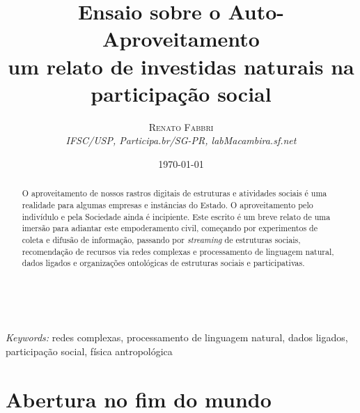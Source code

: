 \documentclass[a4paper, 11pt]{article} %
\title{\textbf{Ensaio sobre o Auto-Aproveitamento}\\ %
um relato de investidas naturais na participação social} %
\author{\textsc{Renato Fabbri} %
\\{\textit{IFSC/USP, Participa.br/SG-PR, labMacambira.sf.net}}} %
\date{\today} %
\makeatletter
\renewcommand{\maketitle}{ %
\begin{flushright} %
{\LARGE\@title} %

\vspace{50pt} %

{\large\@author} %
\\\@date %

\vspace{40pt} %
\end{flushright}
}
\makeatother
\begin{document}
\maketitle %



\begin{abstract}
O aproveitamento de nossos rastros digitais de estruturas e atividades sociais é uma realidade para algumas empresas e instâncias do Estado. O aproveitamento pelo indivídulo e pela Sociedade ainda é incipiente. Este escrito é um breve relato de uma imersão para adiantar este empoderamento civil, começando por experimentos de coleta e difusão de informação, passando por \emph{streaming} de estruturas sociais, recomendação de recursos via redes complexas e processamento de linguagem natural, dados ligados e organizações ontológicas de estruturas sociais e participativas.
\end{abstract}

\hspace*{3,6mm}\textit{Keywords:} redes complexas, processamento de linguagem natural, dados ligados, participação social, física antropológica %


\tableofcontents


\section*{Abertura no fim do mundo}
\end{document}
